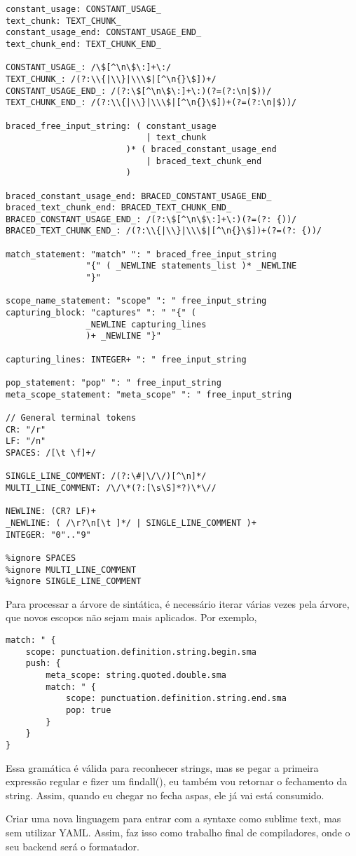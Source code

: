 \begin{lstlisting}
constant_usage: CONSTANT_USAGE_
text_chunk: TEXT_CHUNK_
constant_usage_end: CONSTANT_USAGE_END_
text_chunk_end: TEXT_CHUNK_END_

CONSTANT_USAGE_: /\$[^\n\$\:]+\:/
TEXT_CHUNK_: /(?:\\{|\\}|\\\$|[^\n{}\$])+/
CONSTANT_USAGE_END_: /(?:\$[^\n\$\:]+\:)(?=(?:\n|$))/
TEXT_CHUNK_END_: /(?:\\{|\\}|\\\$|[^\n{}\$])+(?=(?:\n|$))/

braced_free_input_string: ( constant_usage
                            | text_chunk
                        )* ( braced_constant_usage_end
                            | braced_text_chunk_end
                        )

braced_constant_usage_end: BRACED_CONSTANT_USAGE_END_
braced_text_chunk_end: BRACED_TEXT_CHUNK_END_
BRACED_CONSTANT_USAGE_END_: /(?:\$[^\n\$\:]+\:)(?=(?: {))/
BRACED_TEXT_CHUNK_END_: /(?:\\{|\\}|\\\$|[^\n{}\$])+(?=(?: {))/

match_statement: "match" ": " braced_free_input_string
                "{" ( _NEWLINE statements_list )* _NEWLINE
                "}"

scope_name_statement: "scope" ": " free_input_string
capturing_block: "captures" ": " "{" (
                _NEWLINE capturing_lines
                )+ _NEWLINE "}"

capturing_lines: INTEGER+ ": " free_input_string

pop_statement: "pop" ": " free_input_string
meta_scope_statement: "meta_scope" ": " free_input_string

// General terminal tokens
CR: "/r"
LF: "/n"
SPACES: /[\t \f]+/

SINGLE_LINE_COMMENT: /(?:\#|\/\/)[^\n]*/
MULTI_LINE_COMMENT: /\/\*(?:[\s\S]*?)\*\//

NEWLINE: (CR? LF)+
_NEWLINE: ( /\r?\n[\t ]*/ | SINGLE_LINE_COMMENT )+
INTEGER: "0".."9"

%ignore SPACES
%ignore MULTI_LINE_COMMENT
%ignore SINGLE_LINE_COMMENT
\end{lstlisting}


Para processar a árvore de sintática, é necessário iterar várias vezes pela árvore, que novos escopos não sejam mais aplicados.
Por exemplo,
\begin{lstlisting}
match: " {
    scope: punctuation.definition.string.begin.sma
    push: {
        meta_scope: string.quoted.double.sma
        match: " {
            scope: punctuation.definition.string.end.sma
            pop: true
        }
    }
}
\end{lstlisting}
Essa gramática é válida para reconhecer strings, mas se pegar a primeira expressão
regular e fizer um findall(), eu também vou retornar o fechamento da string.
Assim, quando eu chegar no fecha aspas, ele já vai está consumido.

Criar uma nova linguagem para entrar com a syntaxe como sublime text, mas sem utilizar YAML.
Assim, faz isso como trabalho final de compiladores, onde o seu backend será o formatador.


